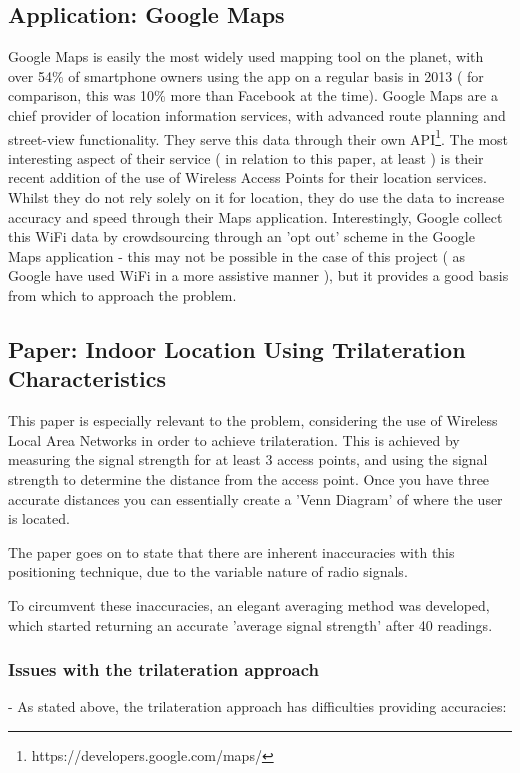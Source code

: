 \documentclass[11pt]{informatics-report}
\begin{document}
\subsection{Application: Google Maps}

Google Maps is easily the most widely used mapping tool on the planet, with over 54\% of smartphone owners using the app on a regular basis in 2013 ( for comparison, this was 10\% more than Facebook at the time)\cite{googlemaps}. Google Maps are a chief provider of location information services, with advanced route planning and street-view functionality. They serve this data through their own API\footnote{https://developers.google.com/maps/}. The most interesting aspect of their service ( in relation to this paper, at least ) is their recent addition of the use of Wireless Access Points for their location services. Whilst they do not rely solely on it for location, they do use the data to increase accuracy and speed through their Maps application\cite{googlewifi}. Interestingly, Google collect this WiFi data by crowdsourcing through an 'opt out' scheme in the Google Maps application\cite{googlewifi2} - this may not be possible in the case of this project ( as Google have used WiFi in a more assistive manner ), but it provides a good basis from which to approach the problem.

\subsection{Paper: Indoor Location Using Trilateration Characteristics}\cite{cook2005indoor}

This paper is especially relevant to the problem, considering the use of Wireless Local Area Networks in order to achieve trilateration. This is achieved by measuring the signal strength for at least 3 access points, and using the signal strength to determine the distance from the access point. Once you have three accurate distances you can essentially create a 'Venn Diagram' of where the user is located.

The paper goes on to state that there are inherent inaccuracies with this positioning technique, due to the variable nature of radio signals\cite{cook2005indoor}. 

To circumvent these inaccuracies, an elegant averaging method was developed, which started returning an accurate 'average signal strength' after 40 readings.

\subsubsection{Issues with the trilateration approach}
- As stated above, the trilateration approach has difficulties providing accuracies:
\end{document}

